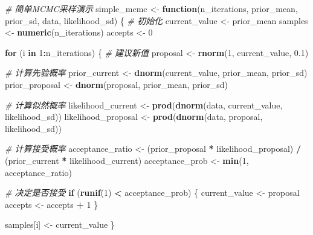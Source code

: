 \documentclass[
]{book}
\newenvironment{Shaded}{\begin{snugshade}}{\end{snugshade}}
\newcommand{\CommentTok}[1]{\textcolor[rgb]{0.56,0.35,0.01}{\textit{#1}}}
\newcommand{\ControlFlowTok}[1]{\textcolor[rgb]{0.13,0.29,0.53}{\textbf{#1}}}
\newcommand{\DecValTok}[1]{\textcolor[rgb]{0.00,0.00,0.81}{#1}}
\newcommand{\FloatTok}[1]{\textcolor[rgb]{0.00,0.00,0.81}{#1}}
\newcommand{\FunctionTok}[1]{\textcolor[rgb]{0.13,0.29,0.53}{\textbf{#1}}}
\newcommand{\NormalTok}[1]{#1}
\newcommand{\OtherTok}[1]{\textcolor[rgb]{0.56,0.35,0.01}{#1}}
\newcommand{\SpecialCharTok}[1]{\textcolor[rgb]{0.81,0.36,0.00}{\textbf{#1}}}
\begin{document}
\begin{Shaded}
\begin{Highlighting}[]
\CommentTok{\# 简单MCMC采样演示}
\NormalTok{simple\_mcmc }\OtherTok{\textless{}{-}} \ControlFlowTok{function}\NormalTok{(n\_iterations, prior\_mean, prior\_sd, data, likelihood\_sd) \{}
  \CommentTok{\# 初始化}
\NormalTok{  current\_value }\OtherTok{\textless{}{-}}\NormalTok{ prior\_mean}
\NormalTok{  samples }\OtherTok{\textless{}{-}} \FunctionTok{numeric}\NormalTok{(n\_iterations)}
\NormalTok{  accepts }\OtherTok{\textless{}{-}} \DecValTok{0}

  \ControlFlowTok{for}\NormalTok{ (i }\ControlFlowTok{in} \DecValTok{1}\SpecialCharTok{:}\NormalTok{n\_iterations) \{}
    \CommentTok{\# 建议新值}
\NormalTok{    proposal }\OtherTok{\textless{}{-}} \FunctionTok{rnorm}\NormalTok{(}\DecValTok{1}\NormalTok{, current\_value, }\FloatTok{0.1}\NormalTok{)}

    \CommentTok{\# 计算先验概率}
\NormalTok{    prior\_current }\OtherTok{\textless{}{-}} \FunctionTok{dnorm}\NormalTok{(current\_value, prior\_mean, prior\_sd)}
\NormalTok{    prior\_proposal }\OtherTok{\textless{}{-}} \FunctionTok{dnorm}\NormalTok{(proposal, prior\_mean, prior\_sd)}

    \CommentTok{\# 计算似然概率}
\NormalTok{    likelihood\_current }\OtherTok{\textless{}{-}} \FunctionTok{prod}\NormalTok{(}\FunctionTok{dnorm}\NormalTok{(data, current\_value, likelihood\_sd))}
\NormalTok{    likelihood\_proposal }\OtherTok{\textless{}{-}} \FunctionTok{prod}\NormalTok{(}\FunctionTok{dnorm}\NormalTok{(data, proposal, likelihood\_sd))}

    \CommentTok{\# 计算接受概率}
\NormalTok{    acceptance\_ratio }\OtherTok{\textless{}{-}}\NormalTok{ (prior\_proposal }\SpecialCharTok{*}\NormalTok{ likelihood\_proposal) }\SpecialCharTok{/}\NormalTok{ (prior\_current }\SpecialCharTok{*}\NormalTok{ likelihood\_current)}
\NormalTok{    acceptance\_prob }\OtherTok{\textless{}{-}} \FunctionTok{min}\NormalTok{(}\DecValTok{1}\NormalTok{, acceptance\_ratio)}

    \CommentTok{\# 决定是否接受}
    \ControlFlowTok{if}\NormalTok{ (}\FunctionTok{runif}\NormalTok{(}\DecValTok{1}\NormalTok{) }\SpecialCharTok{\textless{}}\NormalTok{ acceptance\_prob) \{}
\NormalTok{      current\_value }\OtherTok{\textless{}{-}}\NormalTok{ proposal}
\NormalTok{      accepts }\OtherTok{\textless{}{-}}\NormalTok{ accepts }\SpecialCharTok{+} \DecValTok{1}
\NormalTok{    \}}

\NormalTok{    samples[i] }\OtherTok{\textless{}{-}}\NormalTok{ current\_value}
\NormalTok{  \}}


\end{Highlighting}
\end{Shaded}
\end{document}
